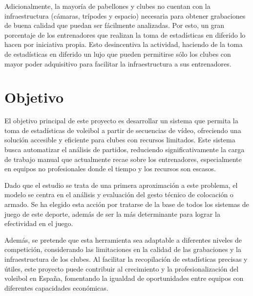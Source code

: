 \documentclass[12pt]{report} %
\begin{document}
    Adicionalmente, la mayoría de pabellones y clubes no cuentan con la
    infraestructura (cámaras, trípodes y espacio) necesaria para obtener
    grabaciones de buena calidad que puedan ser fácilmente analizadas. Por esto, 
    un gran porcentaje de los entrenadores que realizan la toma de estadísticas
    en diferido lo hacen por iniciativa propia. Esto desincentiva la actividad,
    haciendo de la toma de estadísticas en diferido un lujo que pueden
    permitirse sólo los clubes con mayor poder adquisitivo para facilitar la
    infraestructura a sus entrenadores.
    
    
    \chapter{Objetivo}
    \label{chap:metodos}

    El objetivo principal de este proyecto es desarrollar un sistema que
    permita la toma de estadísticas de voleibol a partir de secuencias de
    vídeo, ofreciendo una solución accesible y eficiente para clubes con
    recursos limitados. Este sistema busca automatizar el análisis de partidos,
    reduciendo significativamente la carga de trabajo manual que actualmente
    recae sobre los entrenadores, especialmente en equipos no profesionales
    donde el tiempo y los recursos son escasos.

    Dado que el estudio se trata de una primera aproximación a este problema,
    el modelo se centra en el análisis y evaluación del gesto técnico de
    colocación o armado. Se ha elegido esta acción por tratarse de la base de
    todos los sistemas de juego de este deporte, además de ser la más
    determinante para lograr la efectividad en el juego.

    Además, se pretende que esta herramienta sea adaptable a diferentes niveles de
    competición, considerando las limitaciones en la calidad de las grabaciones y
    la infraestructura de los clubes. Al facilitar la recopilación de estadísticas
    precisas y útiles, este proyecto puede contribuir al crecimiento y la
    profesionalización del voleibol en España, fomentando la igualdad de
    oportunidades entre equipos con diferentes capacidades económicas.
\end{document}
